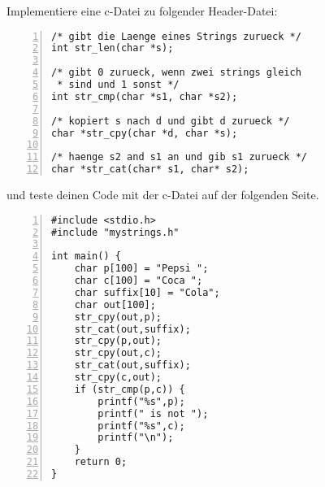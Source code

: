 \documentclass{uebungszettel}
\begin{document}
\begin{aufg} Implementiere eine c-Datei zu folgender Header-Datei: 
\begin{codelisting}
\begin{lstlisting}[numbers=left,numberstyle=\tiny,frame=tlrb]
/* gibt die Laenge eines Strings zurueck */
int str_len(char *s); 

/* gibt 0 zurueck, wenn zwei strings gleich 
 * sind und 1 sonst */
int str_cmp(char *s1, char *s2);

/* kopiert s nach d und gibt d zurueck */
char *str_cpy(char *d, char *s);

/* haenge s2 and s1 an und gib s1 zurueck */ 
char *str_cat(char* s1, char* s2);
\end{lstlisting}
\end{codelisting}
und teste deinen Code mit der c-Datei auf der folgenden Seite.

\begin{codelisting}
\begin{lstlisting}[numbers=left,numberstyle=\tiny,frame=tlrb]
#include <stdio.h>
#include "mystrings.h"

int main() {
	char p[100] = "Pepsi ";
	char c[100] = "Coca ";
	char suffix[10] = "Cola";
	char out[100];
	str_cpy(out,p); 
	str_cat(out,suffix); 
	str_cpy(p,out);
	str_cpy(out,c);
	str_cat(out,suffix);
	str_cpy(c,out);
	if (str_cmp(p,c)) {
		printf("%s",p);
		printf(" is not ");
		printf("%s",c);
		printf("\n");
	}
	return 0;
}
\end{lstlisting}
\end{codelisting}
\end{aufg}
\end{document}
